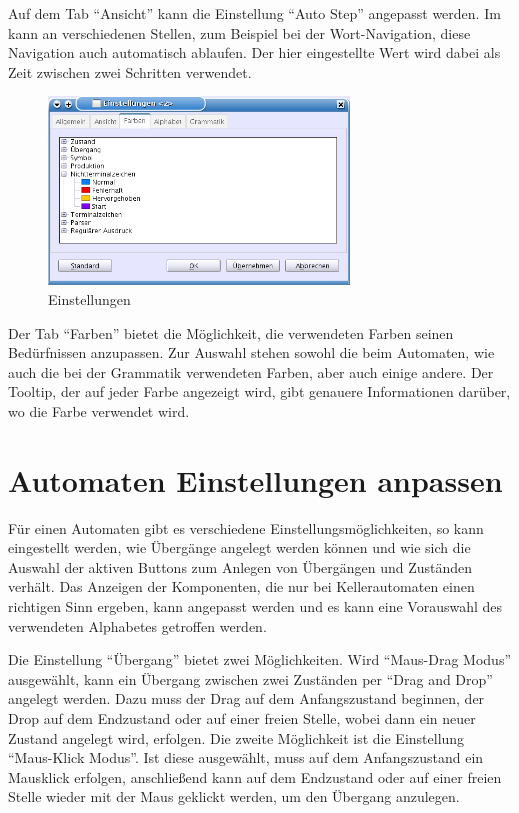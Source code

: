 Auf dem Tab "`Ansicht"' kann die Einstellung "`Auto Step"' angepasst werden. Im
\gtitool kann an verschiedenen Stellen, zum Beispiel bei der Wort-Navigation,
diese Navigation auch automatisch ablaufen. Der hier eingestellte Wert wird dabei
als Zeit zwischen zwei Schritten verwendet.\vspace{10pt}

\begin{figure}[h]
\begin{center}
\includegraphics[width=8cm]{../images/preferences.png}
\caption{Einstellungen}
\end{center}
\end{figure}

Der Tab "`Farben"' bietet die Möglichkeit, die verwendeten Farben seinen
Be\-dürf\-nis\-sen anzupassen. Zur Auswahl stehen sowohl die beim Automaten, wie
auch die bei der Grammatik verwendeten Farben, aber auch einige andere. Der
Tooltip, der auf jeder Farbe angezeigt wird, gibt genauere Informationen
darüber, wo die Farbe verwendet wird.


\section{Automaten Einstellungen anpassen}

Für einen Automaten gibt es verschiedene Einstellungsmöglichkeiten, so kann
eingestellt werden, wie Übergänge angelegt werden können und wie sich die
Auswahl der aktiven Buttons zum Anlegen von Übergängen und Zuständen verhält.
Das Anzeigen der Komponenten, die nur bei Kellerautomaten einen richtigen Sinn
ergeben, kann angepasst werden und es kann eine Vorauswahl des verwendeten
Alphabetes getroffen werden.\vspace{10pt}

Die Einstellung "`Übergang"' bietet zwei Möglichkeiten. Wird "`Maus-Drag Modus"'
ausgewählt, kann ein Übergang zwischen zwei Zuständen per "`Drag and Drop"'
angelegt werden. Dazu muss der Drag auf dem Anfangszustand beginnen, der Drop auf
dem Endzustand oder auf einer freien Stelle, wobei dann ein neuer Zustand
angelegt wird, erfolgen. Die zweite Möglichkeit ist die Einstellung "`Maus-Klick
Modus"'. Ist diese ausgewählt, muss auf dem Anfangszustand ein Mausklick
erfolgen, anschließend kann auf dem Endzustand oder auf einer freien Stelle
wieder mit der Maus geklickt werden, um den Übergang anzulegen.\vspace{10pt}

